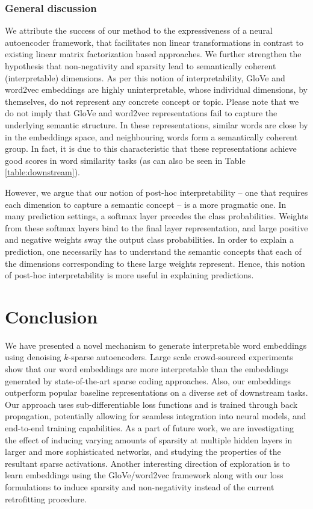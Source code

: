 \documentclass[letterpaper]{article} %
\begin{document}
\subsubsection{General discussion}
We attribute the success of our method to the expressiveness of a neural autoencoder framework, that facilitates non linear transformations in contrast to existing linear matrix factorization based approaches. We further strengthen the hypothesis that non-negativity and sparsity lead to semantically coherent (interpretable) dimensions.
As per this notion of interpretability, GloVe and word2vec embeddings are highly uninterpretable, whose individual dimensions, by themselves, do not represent any concrete concept or topic. Please note that we do not imply that GloVe and word2vec representations fail to capture the underlying semantic structure. In these representations, similar words are close by in the embeddings space, and neighbouring words form a semantically coherent group. In fact, it is due to this characteristic that these representations achieve good scores in word similarity tasks (as can also be seen in Table \ref{table:downstream}).

However, we argue that our notion of post-hoc interpretability -- one that requires each dimension to capture a semantic concept -- is a more pragmatic one. In many prediction settings, a softmax layer precedes the class probabilities. Weights from these softmax layers bind to the final layer representation, and large positive and negative weights sway the output class probabilities. In order to explain a prediction, one necessarily has to understand the semantic concepts that each of the dimensions corresponding to these large weights represent. Hence, this notion of post-hoc interpretability is more useful in explaining predictions.




\section{Conclusion}

We have presented a novel mechanism to generate interpretable word embeddings using denoising $k$-sparse autoencoders. Large scale crowd-sourced experiments show that our word embeddings are more interpretable than the embeddings generated by state-of-the-art sparse coding approaches. Also, our embeddings outperform popular baseline representations on a diverse set of downstream tasks.
Our approach uses sub-differentiable loss functions and is trained through back propagation, potentially allowing for seamless integration into neural models, and end-to-end training capabilities. As a part of future work, we are investigating the effect of inducing varying amounts of sparsity at multiple hidden layers in larger and more sophisticated networks, and studying the properties of the resultant sparse activations. Another interesting direction of exploration is to learn embeddings using the GloVe/word2vec framework along with our loss formulations to induce sparsity and non-negativity instead of the current retrofitting procedure.
\end{document}
